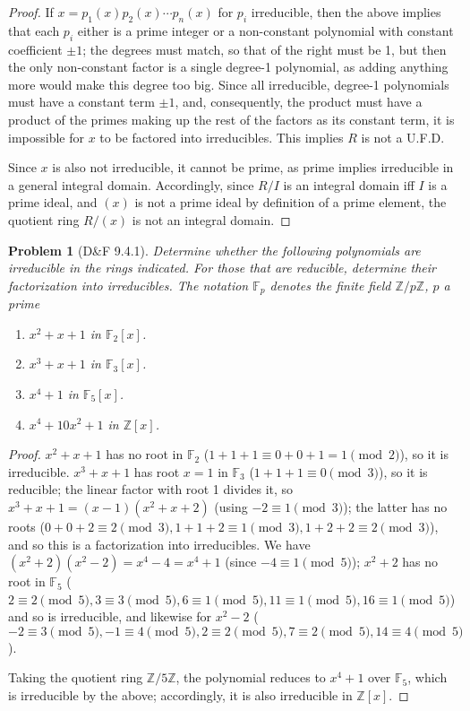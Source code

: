 \documentclass{article}
\newtheorem{plm}{Problem}
\begin{document}
\begin{proof}
  If $x = p_{1}(x)p_{2}(x) \cdots p_{n}(x)$ for $p_{i}$ irreducible, then the above implies that each $p_{i}$ either is a prime integer
  or a non-constant polynomial with constant coefficient $\pm 1$; the degrees must match, so that of the right must be 1,
  but then the only non-constant factor is a single degree-1 polynomial, as adding anything more would make this degree too big.
  Since all irreducible, degree-1 polynomials must have a constant term $\pm 1$, and, consequently,
  the product must have a product of the primes making up the rest of the factors as its constant term,
  it is impossible for $x$ to be factored into irreducibles.
  This implies $R$ is not a U.F.D.

  Since $x$ is also not irreducible, it cannot be prime, as prime implies irreducible in a general integral domain.
  Accordingly, since $R / I$ is an integral domain iff $I$ is a prime ideal, and $(x)$ is not a prime ideal by definition of a prime element,
  the quotient ring $R / (x)$ is not an integral domain.
\end{proof}

\begin{plm}[D\&F 9.4.1]
  Determine whether the following polynomials are irreducible in the rings indicated.
  For those that are reducible, determine their factorization into irreducibles.
  The notation $\mathbb{F}_{p}$ denotes the finite field $\mathbb{Z} / p\mathbb{Z}$, $p$ a prime
  \begin{enumerate}
  \item $x^{2} + x + 1$ in $\mathbb{F}_{2}[x]$.
  \item $x^{3} + x + 1$ in $\mathbb{F}_{3}[x]$.
  \item $x^{4} + 1$ in $\mathbb{F}_{5}[x]$.
  \item $x^{4} + 10x^{2} + 1$ in $\mathbb{Z}[x]$.
  \end{enumerate}
\end{plm}

\begin{proof}
  $x^{2} + x + 1$ has no root in $\mathbb{F}_{2}$ ($1 + 1 + 1 \equiv 0 + 0 + 1 = 1 \pmod 2$), so it is irreducible.
  $x^{3} + x + 1$ has root $x = 1$ in $\mathbb{F}_{3}$ ($1 + 1 + 1 \equiv 0 \pmod 3$), so it is reducible; the linear factor with root 1 divides it,
  so $x^{3} + x + 1 = (x - 1)(x^{2} + x + 2)$ (using $-2 \equiv 1 \pmod 3$); the latter has no roots ($0 + 0 + 2 \equiv 2 \pmod 3,
  1 + 1 + 2 \equiv 1 \pmod 3, 1 + 2 + 2 \equiv 2 \pmod 3$), and so this is a factorization into irreducibles.
  We have $(x^{2} + 2)(x^{2} - 2) = x^{4} - 4 = x^{4} + 1$ (since $-4 \equiv 1 \pmod 5$); $x^{2} + 2$ has no root in $\mathbb{F}_{5}$
  ($2 \equiv 2 \pmod 5, 3 \equiv 3 \pmod 5, 6 \equiv 1 \pmod 5, 11 \equiv 1 \pmod 5, 16 \equiv 1 \pmod 5$)
  and so is irreducible, and likewise for $x^{2} - 2$
  ($-2 \equiv 3 \pmod 5, -1 \equiv 4 \pmod 5, 2 \equiv 2 \pmod 5, 7 \equiv 2 \pmod 5, 14 \equiv 4 \pmod 5$).

  Taking the quotient ring $\mathbb{Z} / 5 \mathbb{Z}$, the polynomial reduces to $x^{4} + 1$ over $\mathbb{F}_{5}$,
  which is irreducible by the above; accordingly, it is also irreducible in $\mathbb{Z}[x]$.
\end{proof}
\end{document}
